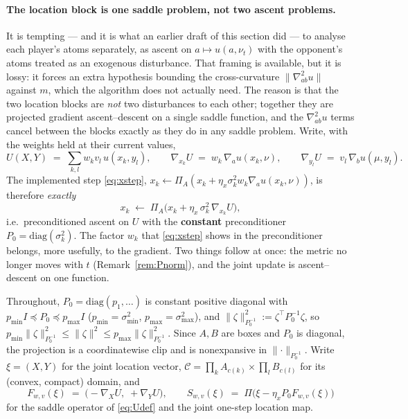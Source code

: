 \documentclass[11pt,a4paper]{article}
\theoremstyle{plain}
\theoremstyle{definition}
\theoremstyle{remark}
\newcommand{\norm}[1]{\lVert #1 \rVert}
\begin{document}
\paragraph{The location block is one saddle problem, not two ascent problems.}
It is tempting --- and it is what an earlier draft of this section did --- to analyse
each player's atoms separately, as ascent on $a\mapsto u(a,\nu_t)$ with the opponent's
atoms treated as an exogenous disturbance. That framing is available, but it is lossy:
it forces an extra hypothesis bounding the cross-curvature $\norm{\nabla^2_{ab}u}$
against $m$, which the algorithm does not actually need. The reason is that the two
location blocks are \emph{not} two disturbances to each other; together they are
projected gradient ascent--descent on a single saddle function, and the
$\nabla^2_{ab}u$ terms cancel between the blocks exactly as they do in any saddle
problem. Write, with the weights held at their current values,
\begin{equation}\label{eq:Udef}
U(X,Y)\;=\;\sum_{k,l}w_kv_l\,u(x_k,y_l),\qquad
\nabla_{x_k}U \;=\; w_k\,\nabla_a u(x_k,\nu),\qquad
\nabla_{y_l}U \;=\; v_l\,\nabla_b u(\mu,y_l).
\end{equation}
The implemented step \eqref{eq:xstep}, $x_k\leftarrow\Pi_A(x_k+\eta_x\sigma_k^2w_k\nabla_au(x_k,\nu))$,
is therefore \emph{exactly}
\[
x_k\;\leftarrow\;\Pi_A\big(x_k+\eta_x\,\sigma_k^2\,\nabla_{x_k}U\big),
\]
i.e.\ preconditioned ascent on $U$ with the \textbf{constant} preconditioner
$P_0=\mathrm{diag}(\sigma_k^2)$. The factor $w_k$ that \eqref{eq:xstep} shows in the
preconditioner belongs, more usefully, to the gradient. Two things follow at once: the
metric no longer moves with $t$ (Remark~\ref{rem:Pnorm}), and the joint update is
ascent--descent on one function.

\medskip
\noindent Throughout, $P_0=\mathrm{diag}(p_1,\dots)$ is constant positive diagonal with
$p_{\min}I\preceq P_0\preceq p_{\max}I$ ($p_{\min}=\sigma_{\min}^2$,
$p_{\max}=\sigma_{\max}^2$), and $\norm{\zeta}_{P_0^{-1}}^2:=\zeta^\top P_0^{-1}\zeta$, so
$p_{\min}\norm{\zeta}^2_{P_0^{-1}}\le\norm{\zeta}^2\le p_{\max}\norm{\zeta}^2_{P_0^{-1}}$.
Since $A,B$ are boxes and $P_0$ is diagonal, the projection is a coordinatewise clip and
is nonexpansive in $\norm{\cdot}_{P_0^{-1}}$. Write $\xi=(X,Y)$ for the joint location
vector, $\mathcal C=\prod_kA_{c(k)}\times\prod_lB_{c(l)}$ for its (convex, compact)
domain, and
\[
F_{w,v}(\xi)\;=\;\big(-\nabla_XU,\;+\nabla_YU\big),\qquad
S_{w,v}(\xi)\;=\;\Pi\big(\xi-\eta_xP_0F_{w,v}(\xi)\big)
\]
for the saddle operator of \eqref{eq:Udef} and the joint one-step location map.
\end{document}
